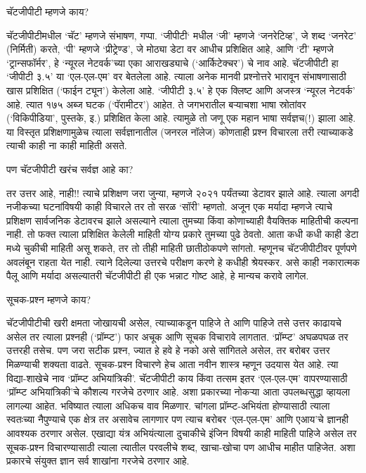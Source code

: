 चॅटजीपीटी म्हणजे काय?

चॅटजीपीटीमधील `चॅट' म्हणजे संभाषण, गप्पा. `जीपीटी` मधील `जी' म्हणजे `जनरेटिव्ह', जे शब्द `जनरेट' (निर्मिती) करते, `पी' म्हणजे `प्रीट्रेण्ड', जे मोठ्या डेटा वर आधीच प्रशिक्षित आहे, आणि `टी' म्हणजे `ट्रान्सफॉर्मर', हे `न्यूरल नेटवर्क'च्या एका आराखड्याचे (`आर्किटेक्चर') चे नाव आहे. चॅटजीपीटी हा `जीपीटी ३.५' या `एल-एल-एम' वर बेतलेला आहे. त्याला अनेक मानवी प्रश्नोत्तरे भारावून संभाषणासाठी खास प्रशिक्षित (`फाईन ट्यून') केलेला आहे. `जीपीटी ३.५' हे एक क्लिष्ट आणि अजस्त्र `न्यूरल नेटवर्क' आहे. त्यात १७५ अब्ज घटक (`पॅरामीटर') आहेत. ते जगभरातील बऱ्याचशा भाषा स्रोतांवर (`विकिपीडिया', पुस्तके, इ.) प्रशिक्षित केला आहे. त्यामुळे तो जणू एक महान भाषा सर्वज्ञच(!) झाला आहे. या विस्तृत प्रशिक्षणामुळेच त्याला सर्वज्ञानातील (जनरल नॉलेज) कोणताही प्रश्न विचारला तरी त्याच्याकडे त्याची काही ना काही माहिती असते.

पण चॅटजीपीटी खरंच सर्वज्ञ आहे का? 

तर उत्तर आहे, नाही!! त्याचे प्रशिक्षण जरा जुन्या, म्हणजे २०२१ पर्यंतच्या डेटावर झाले आहे. त्याला अगदी नजीकच्या घटनांविषयी काही विचारले तर तो सरळ `सॉरी' म्हणतो. अजून एक मर्यादा म्हणजे त्याचे प्रशिक्षण सार्वजनिक डेटावरच झाले असल्याने त्याला तुमच्या किंवा कोणाच्याही वैयक्तिक माहितीची कल्पना नाही. तो फक्त त्याला प्रशिक्षित केलेली माहिती योग्य प्रकारे तुमच्या पुढे ठेवतो. आता कधी कधी काही डेटा मध्ये चुकीची माहिती असू शकते, तर तो तीही माहिती छातीठोकपणे सांगतो. म्हणूनच चॅटजीपीटीवर पूर्णपणे अवलंबून राहता येत नाही. त्याने दिलेल्या उत्तरचे परीक्षण करणे हे कधीही श्रेयस्कर. असे काही नकारात्मक पैलू आणि मर्यादा असल्यातरी चॅटजीपीटी ही एक भन्नाट गोष्ट आहे, हे मान्यच करावे लागेल.

सूचक-प्रश्न म्हणजे काय?

चॅटजीपीटीची खरी क्षमता जोखायची असेल, त्याच्याकडून पाहिजे ते आणि पाहिजे तसे उत्तर काढायचे असेल तर त्याला प्रश्नही (`प्रॉम्प्ट') फार अचूक आणि सूचक विचारावे लागतात. `प्रॉम्प्ट' अघळपघळ तर उत्तरही तसेच. पण जरा सटीक प्रश्न, ज्यात हे हवे हे नको असे सांगितले असेल, तर बरोबर उत्तर मिळण्याची शक्यता वाढते. सूचक-प्रश्न विचारणे हेच आता नवीन शास्त्र म्हणून उदयास येत आहे. त्या विद्या-शाखेचे नाव `प्रॉम्प्ट अभियांत्रिकी'. चॅटजीपीटी काय किंवा तत्सम इतर `एल-एल-एम' वापरण्यासाठी `प्रॉम्प्ट अभियांत्रिकी'चे कौशल्य गरजेचे ठरणार आहे. अशा प्रकारच्या नोकऱ्या आता उपलब्धसुद्धा व्हायला लागल्या आहेत. भविष्यात त्याला अधिकच वाव मिळणार. चांगला प्रॉम्प्ट-अभियंता होण्यासाठी त्याला स्वतःच्या नैपुण्याचे एक क्षेत्र तर असावेच लागणार पण त्याच बरोबर `एल-एल-एम' आणि एआय'चे ज्ञानही आवश्यक ठरणार असेल. एखाद्या यंत्र अभियंत्याला दुचाकीचे इंजिन विषयी काही माहिती पाहिजे असेल तर सूचक-प्रश्न विचारण्यासाठी त्याला त्यातील परवलीचे शब्द, खाचा-खोचा पण आधीच माहीत पाहिजेत. अशा प्रकारचे संयुक्त ज्ञान सर्व शाखांना गरजेचे ठरणार आहे.

